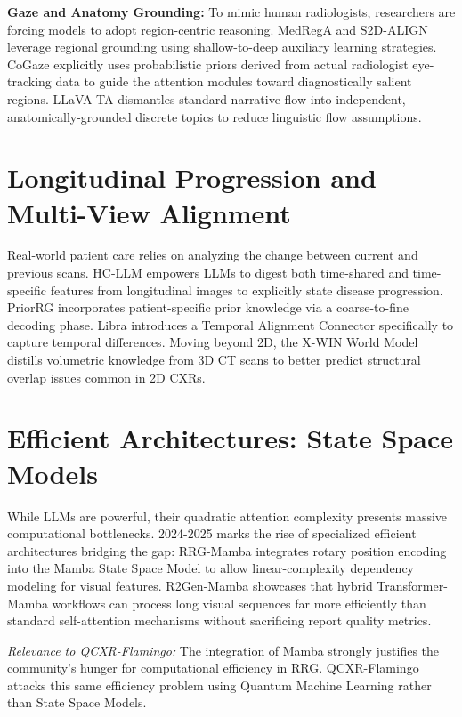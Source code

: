 \documentclass[11pt]{article}
\begin{document}
\textbf{Gaze and Anatomy Grounding:}
To mimic human radiologists, researchers are forcing models to adopt region-centric reasoning. MedRegA \cite{medrega2025} and S2D-ALIGN \cite{s2dalign2026} leverage regional grounding using shallow-to-deep auxiliary learning strategies. CoGaze \cite{liu2026cogaze} explicitly uses probabilistic priors derived from actual radiologist eye-tracking data to guide the attention modules toward diagnostically salient regions. LLaVA-TA \cite{llavata2026} dismantles standard narrative flow into independent, anatomically-grounded discrete topics to reduce linguistic flow assumptions.

\section{Longitudinal Progression and Multi-View Alignment}

Real-world patient care relies on analyzing the change between current and previous scans. HC-LLM \cite{hcllm2025} empowers LLMs to digest both time-shared and time-specific features from longitudinal images to explicitly state disease progression. PriorRG \cite{liu2026priorrg} incorporates patient-specific prior knowledge via a coarse-to-fine decoding phase. Libra \cite{zhang2025libra} introduces a Temporal Alignment Connector specifically to capture temporal differences. Moving beyond 2D, the X-WIN World Model \cite{xwin2026} distills volumetric knowledge from 3D CT scans to better predict structural overlap issues common in 2D CXRs.

\section{Efficient Architectures: State Space Models}

While LLMs are powerful, their quadratic attention complexity presents massive computational bottlenecks. 2024-2025 marks the rise of specialized efficient architectures bridging the gap:
RRG-Mamba \cite{rrgmamba2025} integrates rotary position encoding into the Mamba State Space Model to allow linear-complexity dependency modeling for visual features. R2Gen-Mamba \cite{r2genmamba2025} showcases that hybrid Transformer-Mamba workflows can process long visual sequences far more efficiently than standard self-attention mechanisms without sacrificing report quality metrics.

\textit{Relevance to QCXR-Flamingo:} The integration of Mamba strongly justifies the community's hunger for computational efficiency in RRG. QCXR-Flamingo attacks this same efficiency problem using Quantum Machine Learning rather than State Space Models.
\end{document}
